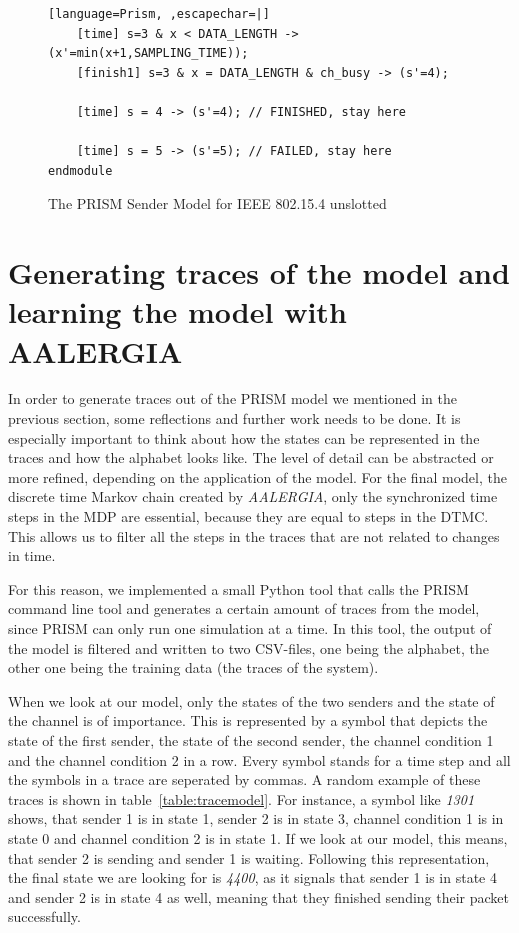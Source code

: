 \documentclass[
a4paper,
12pt
]{scrartcl}
\begin{document}
\begin{figure}[H]
\begin{lstlisting}[language=Prism, ,escapechar=|]
	[time] s=3 & x < DATA_LENGTH -> (x'=min(x+1,SAMPLING_TIME));
	[finish1] s=3 & x = DATA_LENGTH & ch_busy -> (s'=4);

	[time] s = 4 -> (s'=4); // FINISHED, stay here

	[time] s = 5 -> (s'=5); // FAILED, stay here
endmodule

\end{lstlisting}
\caption{The PRISM Sender Model for IEEE 802.15.4 unslotted}
\label{fig:sendermodel}
\end{figure}

\newpage
\section{Generating traces of the model and learning the model with AALERGIA}
In order to generate traces out of the PRISM model we mentioned in the previous section, some reflections and further work needs to be done. It is especially important to think about how the states can be represented in the traces and how the alphabet looks like. The level of detail can be abstracted or more refined, depending on the application of the model. For the final model, the discrete time Markov chain created by \emph{AALERGIA}, only the synchronized time steps in the MDP are essential, because they are equal to steps in the DTMC. This allows us to filter all the steps in the traces that are not related to changes in time.

\par For this reason, we implemented a small Python tool that calls the PRISM command line tool and generates a certain amount of traces from the model, since PRISM can only run one simulation at a time. In this tool, the output of the model is filtered and written to two CSV-files, one being the alphabet, the other one being the training data (the traces of the system).

\par When we look at our model, only the states of the two senders and the state of the channel is of importance. This is represented by a symbol that depicts the state of the first sender, the state of the second sender, the channel condition 1 and the channel condition 2 in a row. Every symbol stands for a time step and all the symbols in a trace are seperated by commas. A random example of these traces is shown in table~\ref{table:tracemodel}. For instance, a symbol like \textit{1301} shows, that sender 1 is in state 1, sender 2 is in state 3, channel condition 1 is in state 0 and channel condition 2 is in state 1. If we look at our model, this means, that sender 2 is sending and sender 1 is waiting. Following this representation, the final state we are looking for is \textit{4400}, as it signals that sender 1 is in state 4 and sender 2 is in state 4 as well, meaning that they finished sending their packet successfully.
\end{document}
